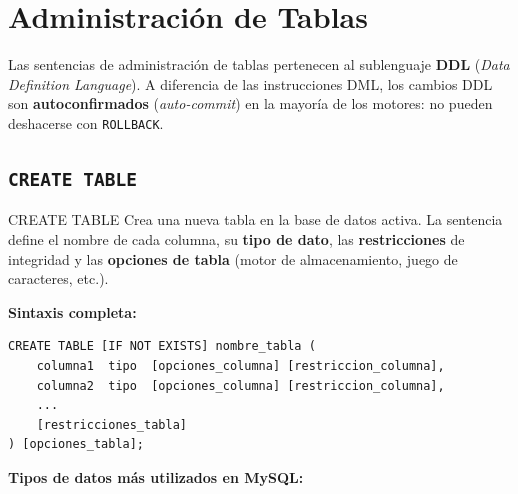 \newpage
\section{Administración de Tablas}

Las sentencias de administración de tablas pertenecen al sublenguaje
\textbf{DDL} (\textit{Data Definition Language}). A diferencia de las
instrucciones DML, los cambios DDL son \textbf{autoconfirmados}
(\textit{auto-commit}) en la mayoría de los motores: no pueden deshacerse
con \texttt{ROLLBACK}.

\subsection{\texttt{CREATE TABLE}}

\begin{definicion}{CREATE TABLE}
  Crea una nueva tabla en la base de datos activa. La sentencia define el
  nombre de cada columna, su \textbf{tipo de dato}, las
  \textbf{restricciones} de integridad y las \textbf{opciones de tabla}
  (motor de almacenamiento, juego de caracteres, etc.).
\end{definicion}

\textbf{Sintaxis completa:}

\begin{lstlisting}[style=sql, caption={Estructura general de CREATE TABLE}]
CREATE TABLE [IF NOT EXISTS] nombre_tabla (
    columna1  tipo  [opciones_columna] [restriccion_columna],
    columna2  tipo  [opciones_columna] [restriccion_columna],
    ...
    [restricciones_tabla]
) [opciones_tabla];
\end{lstlisting}

\textbf{Tipos de datos más utilizados en MySQL:}

